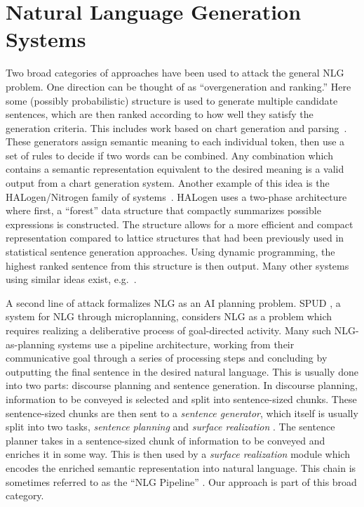 \section{Natural Language Generation Systems}
Two broad categories of
approaches have been used to attack the general NLG problem. One
direction can be thought of as ``overgeneration and ranking.'' Here
some (possibly probabilistic) structure is used to generate multiple
candidate sentences, which are then ranked according to how well they
satisfy the generation criteria. This includes work based on chart
generation and
parsing~\cite{shieber_uniform_1988,kay_chart_1996}. These generators
assign semantic meaning to each individual token, then use a set of
rules to decide if two words can be combined.  Any combination which
contains a semantic representation equivalent to the desired meaning 
is a valid output from a chart generation
system. Another example of this idea is the HALogen/Nitrogen
family of systems~\cite{langkilde_2002_halogen}. HALogen uses a two-phase
architecture where first, a ``forest'' data structure that compactly
summarizes possible expressions is constructed.  The structure allows
for a more efficient and compact representation compared to lattice
structures that had been previously used in statistical sentence
generation approaches.  Using dynamic programming, the highest ranked
sentence from this structure is then output. Many other systems using
similar ideas exist, e.g.~\cite{white_2003_ccg,lu2009natural}.

A second line of attack formalizes NLG as an AI planning problem.
SPUD \cite{stone_2003_spud}, a system for NLG through microplanning,
considers NLG as a problem which requires realizing a deliberative
process of goal-directed activity.  Many such NLG-as-planning systems
use a pipeline architecture, working from their communicative goal
through a series of processing steps and concluding by outputting the
final sentence in the desired natural language. This is usually done
into two parts:
discourse planning and sentence generation. In
discourse planning, information to be conveyed is selected and split
into sentence-sized chunks. These sentence-sized chunks are then sent
to a {\em sentence generator}, which itself is usually split into two
tasks, {\em sentence planning} and {\em surface realization}
\cite{koller_experiences_2011}.  The sentence planner takes in a
sentence-sized chunk of information to be conveyed and enriches it in
some way.  This is then used by a {\em surface realization}
module which encodes the enriched semantic representation into 
 natural language.  This chain is sometimes referred to as the
``NLG Pipeline'' \cite{reiter_building_2000}.  Our approach is
part of this broad category.

